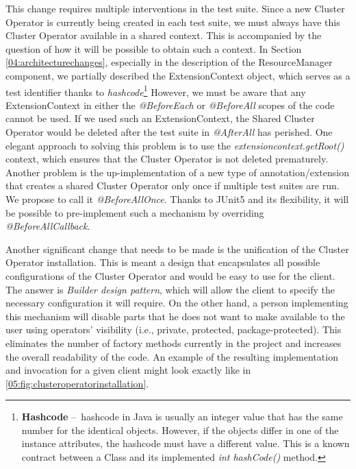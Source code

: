 This change requires multiple interventions in the test suite. Since a new Cluster Operator is currently being created in each test suite, we must always have this Cluster Operator available in a shared context. This is accompanied by the question of how it will be possible to obtain such a context. In Section \ref{04:architecturechanges}, especially in the description of the ResourceManager component, we partially described the ExtensionContext object, which serves as a test identifier thanks to \emph{hashcode}\footnote{\textbf{Hashcode} \---\ hashcode in Java is usually an integer value that has the same number for the identical objects. However, if the objects differ in one of the instance attributes, the hashcode must have a different value. This is a known contract between a Class and its implemented \emph{int hashCode()} method.}  However, we must be aware that any ExtensionContext in either the \emph{@BeforeEach} or \emph{@BeforeAll} scopes of the code cannot be used. If we used such an ExtensionContext, the Shared Cluster Operator would be deleted after the test suite in \emph{@AfterAll} has perished. One elegant approach to solving this problem is to use the \emph{extensioncontext.getRoot()} context, which ensures that the Cluster Operator is not deleted prematurely. Another problem is the up-implementation of a new type of annotation/extension that creates a shared Cluster Operator only once if multiple test suites are run. We propose to call it \emph{@BeforeAllOnce}. Thanks to JUnit5 and its flexibility, it will be possible to pre-implement such a mechanism by overriding \emph{@BeforeAllCallback}.

Another significant change that needs to be made is the unification of the Cluster Operator installation. This is meant a design that encapsulates all possible configurations of the Cluster Operator and would be easy to use for the client. The answer is \emph{Builder design pattern}, which will allow the client to specify the necessary configuration it will require. On the other hand, a person implementing this mechanism will disable parts that he does not want to make available to the user using operators' visibility (i.e., private, protected, package-protected). This eliminates the number of factory methods currently in the project and increases the overall readability of the code. An example of the resulting implementation and invocation for a given client might look exactly like in \ref{05:fig:clusteroperatorinstallation}.

